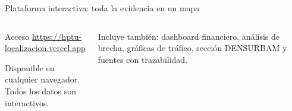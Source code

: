 \documentclass[aspectratio=169, 11pt]{beamer}
\begin{document}
\begin{frame}{Plataforma interactiva: toda la evidencia en un mapa}
\begin{columns}[T]
\vspace{4pt}
\begin{exampleblock}{\small Acceso}
\centering
\small \url{https://hptu-localizacion.vercel.app}

\vspace{4pt}
\footnotesize Disponible en cualquier navegador.\\
Todos los datos son interactivos.
\end{exampleblock}

\vspace{4pt}
{\scriptsize\textcolor{slate}{Incluye también: dashboard financiero, análisis de brecha, gráficas de tráfico, sección DENSURBAM y fuentes con trazabilidad.}}
\end{columns}
\end{frame}
\end{document}
